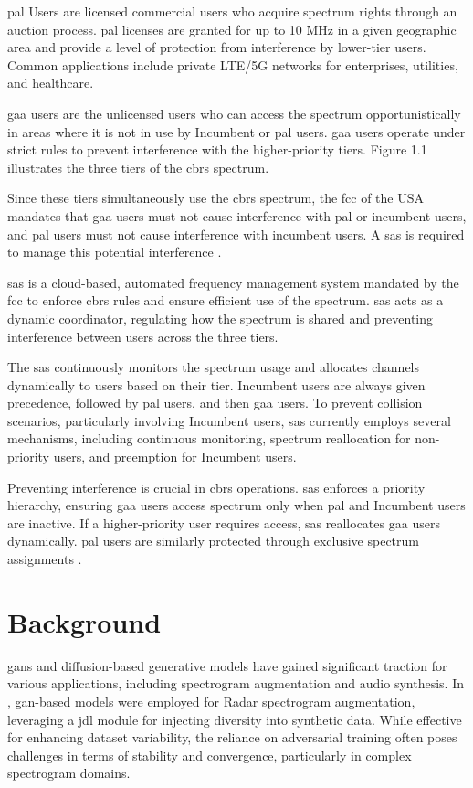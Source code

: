 \gls{pal} Users are licensed commercial users who acquire spectrum rights through an auction process. \gls{pal} licenses are granted for up to 10 MHz in a given geographic area and provide a level of protection from interference by lower-tier users. Common applications include private LTE/5G networks for enterprises, utilities, and healthcare.

\gls{gaa} users are the unlicensed users who can access the spectrum opportunistically in areas where it is not in use by Incumbent or \gls{pal} users.
\gls{gaa} users operate under strict rules to prevent interference with the higher-priority tiers. Figure 1.1 illustrates the three tiers of the \gls{cbrs} spectrum.

Since these tiers simultaneously use the \gls{cbrs} spectrum, the \gls{fcc} of the USA mandates that \gls{gaa} users must not cause interference with \gls{pal} or incumbent users, and \gls{pal} users must not cause interference with incumbent users. A \gls{sas} is required to manage this potential interference \cite{3}.

\gls{sas} is a cloud-based, automated frequency management system mandated by the \gls{fcc} to enforce \gls{cbrs} rules and ensure efficient use of the spectrum. \gls{sas} acts as a dynamic coordinator, regulating how the spectrum is shared and preventing interference between users across the three tiers.

The \gls{sas} continuously monitors the spectrum usage and allocates channels dynamically to users based on their tier. Incumbent users are always given precedence, followed by \gls{pal} users, and then \gls{gaa} users.
To prevent collision scenarios, particularly involving Incumbent users, \gls{sas} currently employs several mechanisms, including continuous monitoring, spectrum reallocation for non-priority users, and preemption for Incumbent users.

Preventing interference is crucial in \gls{cbrs} operations. \gls{sas} enforces a priority hierarchy, ensuring \gls{gaa} users access spectrum only when \gls{pal} and Incumbent users are inactive. If a higher-priority user requires access, \gls{sas} reallocates \gls{gaa} users dynamically. \gls{pal} users are similarly protected through exclusive spectrum assignments \cite{4}.  

\section{Background}

\gls{gan}s and diffusion-based generative models have gained significant traction for various applications, including spectrogram augmentation and audio synthesis. In \cite{14}, \gls{gan}-based models were employed for Radar spectrogram augmentation, leveraging a \gls{jdl} module for injecting diversity into synthetic data. While effective for enhancing dataset variability, the reliance on adversarial training often poses challenges in terms of stability and convergence, particularly in complex spectrogram domains.



